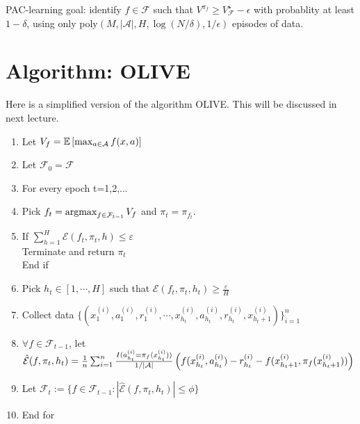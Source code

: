 \documentclass[11pt]{article}
\begin{document}
PAC-learning goal: identify $f\in \mathcal{F}$ such that $V^{\pi_f} \ge V_{\mathcal{F}}^\star - \epsilon$ with probablity at least $1-\delta$, using only poly$(M, |\mathcal{A}|, H, \log(N/\delta), 1/\epsilon)$ episodes of data.

\section{Algorithm: OLIVE}
Here is a simplified version of the algorithm OLIVE. This will be discussed in next lecture.

\begin{enumerate}
	\item Let $V_f=\mathbb{E}\left[ \max_{a\in \mathcal{A}}f(x,a) \right]$
	\item Let $\mathcal{F}_0=\mathcal{F}$
	\item For every epoch t=1,2,...
	\item Pick $f_t=\operatorname*{argmax}_{f\in \mathcal{F}_{t-1}} V_f$ and $\pi_t=\pi_{f_t}$.
	\item If $\sum_{h=1}^{H} \mathcal{E}(f_t,\pi_t,h) \leq \varepsilon$\\
	Terminate and return $\pi_t$\\
	End if
	\item Pick $h_t \in [1, \cdots, H]$ such that $\mathcal{E}({f_t,\pi_t,h_t}) \geq \frac{\varepsilon}{H}$
	\item Collect data $\{(x_1^{(i)}, a_1^{(i)}, r_1^{(i)}, \cdots, x_{h_t}^{(i)}, a_{h_t}^{(i)},r_{h_t}^{(i)},x_{h_t+1}^{(i)}  )\}_{i=1}^n$
	\item $\forall f \in \mathcal{F}_{t-1}$, let $\hat{\mathcal{E}}(f, \pi_t, h_t)=\frac{1}{n}\sum_{i=1}^{n}\frac{I(a_{h_t}^{(i)}=\pi_f(x_{h_t}^{(i)}))}{1/|\mathcal{A}|}\left(f(x_{h_t}^{(i)},a_{h_t}^{(i)})-r_{h_t}^{(i)}-f(x_{h_t+1}^{(i)},\pi_f(x_{h_t+1}^{(i)}))\right)$
	\item Let $\mathcal{F}_t:=\{ f\in \mathcal{F}_{t-1}: |\hat{\mathcal{E}}(f, \pi_t, h_t)|\leq \phi \}$
	\item End for
	\end{enumerate}


\end{document}

